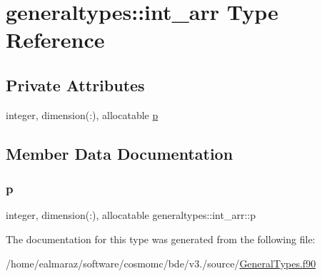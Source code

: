 \hypertarget{structgeneraltypes_1_1int__arr}{}\section{generaltypes\+:\+:int\+\_\+arr Type Reference}
\label{structgeneraltypes_1_1int__arr}
\subsection*{Private Attributes}
\begin{DoxyCompactItemize}
\item 
integer, dimension(\+:), allocatable \mbox{\hyperlink{structgeneraltypes_1_1int__arr_a33e6c0bd7c762b29905d47bc790aab99}{p}}
\end{DoxyCompactItemize}


\subsection{Member Data Documentation}
\mbox{\label{structgeneraltypes_1_1int__arr_a33e6c0bd7c762b29905d47bc790aab99}} 
\subsubsection{\texorpdfstring{p}{p}}
{\footnotesize\ttfamily integer, dimension(\+:), allocatable generaltypes\+::int\+\_\+arr\+::p\hspace{0.3cm}{\ttfamily [private]}}



The documentation for this type was generated from the following file\+:\begin{DoxyCompactItemize}
\item 
/home/ealmaraz/software/cosmomc/bde/v3./source/\mbox{\hyperlink{GeneralTypes_8f90}{General\+Types.\+f90}}\end{DoxyCompactItemize}
